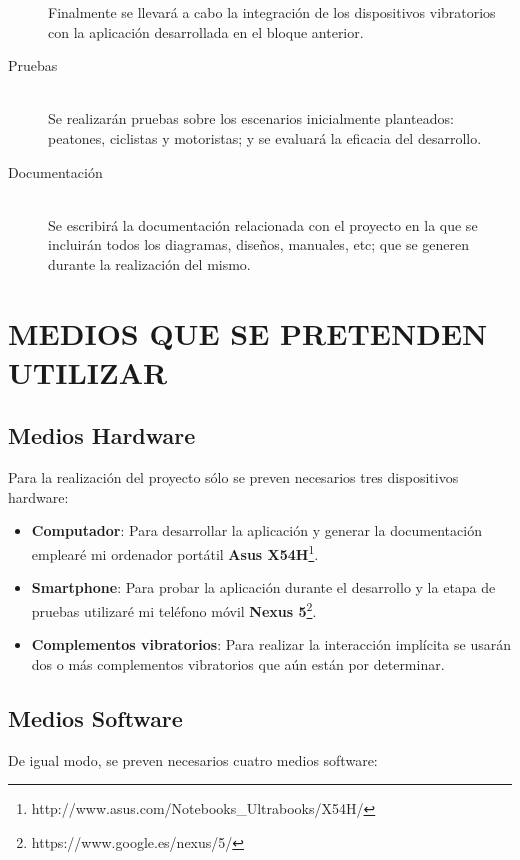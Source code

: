 \documentclass{pre-tfg}
\begin{document}
\begin{description}
  Finalmente se llevará a cabo la integración de los dispositivos vibratorios con la aplicación desarrollada en el bloque anterior.
  
  \item[Pruebas] \hfill \\
  Se realizarán pruebas sobre los escenarios inicialmente planteados: peatones, ciclistas y motoristas; y se evaluará la eficacia del desarrollo.
  
  \item[Documentación] \hfill \\
  Se escribirá la documentación relacionada con el proyecto en la que se incluirán todos los diagramas, diseños, manuales, etc; que se generen durante la realización del mismo.
  
\end{description}

\newpage

\section{MEDIOS QUE SE PRETENDEN UTILIZAR}

\subsection{Medios Hardware}

Para la realización del proyecto sólo se preven necesarios tres dispositivos hardware:

\begin{itemize}
  \item \textbf{Computador}: Para desarrollar la aplicación y generar la documentación emplearé mi ordenador portátil \textbf{Asus X54H}\footnote{http://www.asus.com/Notebooks\_Ultrabooks/X54H/}. 
  \item \textbf{Smartphone}: Para probar la aplicación durante el desarrollo y la etapa de pruebas utilizaré mi teléfono móvil \textbf{Nexus 5}\footnote{https://www.google.es/nexus/5/}.
  \item \textbf{Complementos vibratorios}: Para realizar la interacción implícita se usarán dos o más complementos vibratorios que aún están por determinar.
\end{itemize}

\subsection{Medios Software}

De igual modo, se preven necesarios cuatro medios software:
\end{document}
